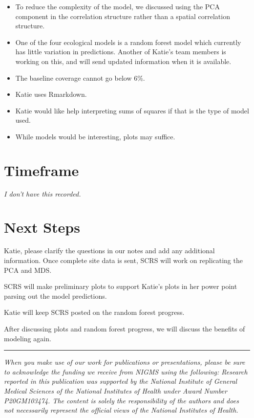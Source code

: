 \documentclass[11pt]{cscrs_notes} %
\begin{document}
\begin{itemize}
\item To reduce the complexity of the model, we discussed using the PCA component in the correlation structure rather than a spatial correlation structure.

\item One of the four ecological models is a random forest model which currently has little variation in predictions. Another of Katie's team members is working on this, and will send updated information when it is available.

\item The baseline coverage cannot go below 6\%.

\item Katie uses Rmarkdown.

\item Katie would like help interpreting sums of squares if that is the type of model used.

\item While models would be interesting, plots may suffice.

\end{itemize}


\section{Timeframe}
{\it I don't have this recorded.}

\section{Next Steps}
Katie, please clarify the questions in our notes and add any additional information.  Once complete site data is sent, SCRS will work on replicating the PCA and MDS.

SCRS will make preliminary plots to support Katie's plots in her power point parsing out the model predictions.

Katie will keep SCRS posted on the random forest progress. 

After discussing plots and random forest progress, we will discuss the benefits of modeling again.

\decorativeline
\hrule

\begin{center}
	   \emph{When you make use of our work for publications or presentations, please be sure to acknowledge the funding we receive from NIGMS using the following: Research reported in this publication was supported by the National Institute of General Medical Sciences of the National Institutes of Health under Award Number P20GM103474. The content is solely the responsibility of the authors and does not necessarily represent the official views of the National Institutes of Health. } 
    \end{center}%
\end{document}
